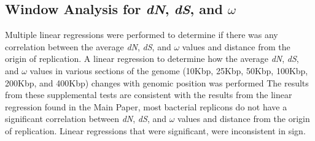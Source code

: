 \documentclass[11pt]{article}
\newcommand{\dn}{\textit{dN}\xspace}
\newcommand{\ds}{\textit{dS}\xspace}
\begin{document}
\subsection{Window Analysis for \dn, \ds, and $\omega$}
Multiple linear regressions were performed to determine if there was any correlation between the average \dn, \ds, and $\omega$ values and distance from the origin of replication.
A linear regression to determine how the average \dn, \ds, and $\omega$ values in various sections of the genome (10Kbp, 25Kbp, 50Kbp, 100Kbp, 200Kbp, and 400Kbp) changes with genomic position was performed %
The results from these supplemental tests are consistent with the results from the linear regression found in the Main Paper, most bacterial replicons do not have a significant correlation between \dn, \ds, and $\omega$ values and distance from the origin of replication.
Linear regressions that were significant, were inconsistent in sign.
\end{document}
